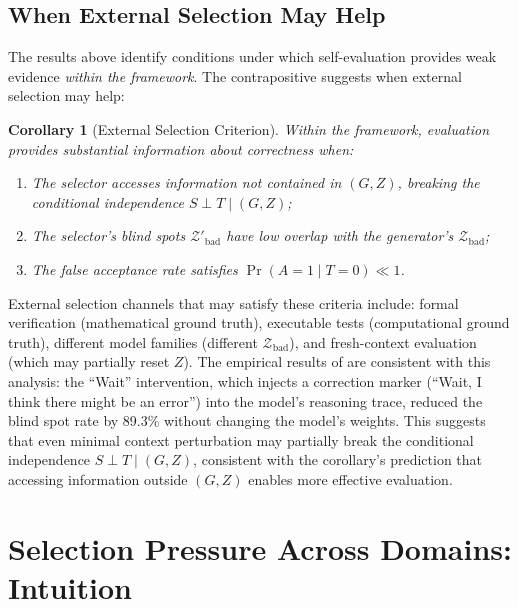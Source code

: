 \documentclass[11pt]{article}
\newtheorem{corollary}[theorem]{Corollary}
\begin{document}
\subsection{When External Selection May Help}

The results above identify conditions under which self-evaluation provides weak evidence \emph{within the framework}. The contrapositive suggests when external selection may help:

\begin{corollary}[External Selection Criterion]
Within the framework, evaluation provides substantial information about correctness when:
\begin{enumerate}
\item The selector accesses information not contained in $(G, Z)$, breaking the conditional independence $S \perp T \mid (G, Z)$;
\item The selector's blind spots $\mathcal{Z}'_{\mathrm{bad}}$ have low overlap with the generator's $\mathcal{Z}_{\mathrm{bad}}$;
\item The false acceptance rate satisfies $\Pr(A = 1 \mid T = 0) \ll 1$.
\end{enumerate}
\end{corollary}

External selection channels that may satisfy these criteria include: formal verification (mathematical ground truth), executable tests (computational ground truth), different model families (different $\mathcal{Z}_{\mathrm{bad}}$), and fresh-context evaluation (which may partially reset $Z$). The empirical results of \citet{tsui2025selfcorrection} are consistent with this analysis: the ``Wait'' intervention, which injects a correction marker (``Wait, I think there might be an error'') into the model's reasoning trace, reduced the blind spot rate by 89.3\% without changing the model's weights. This suggests that even minimal context perturbation may partially break the conditional independence $S \perp T \mid (G, Z)$, consistent with the corollary's prediction that accessing information outside $(G, Z)$ enables more effective evaluation.

\section{Selection Pressure Across Domains: Intuition}
\end{document}
